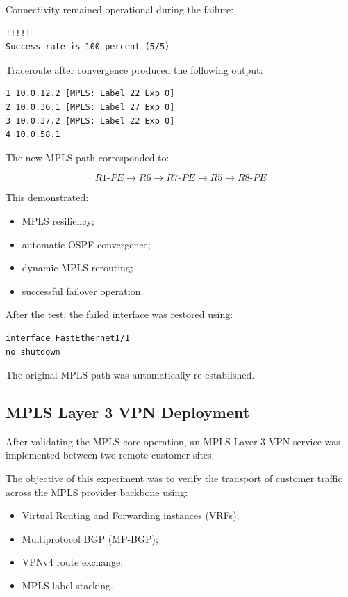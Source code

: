 \documentclass[12pt]{article}
\begin{document}
Connectivity remained operational during the failure:

\begin{lstlisting}
!!!!!
Success rate is 100 percent (5/5)
\end{lstlisting}

Traceroute after convergence produced the following output:

\begin{lstlisting}
1 10.0.12.2 [MPLS: Label 22 Exp 0]
2 10.0.36.1 [MPLS: Label 27 Exp 0]
3 10.0.37.2 [MPLS: Label 22 Exp 0]
4 10.0.58.1
\end{lstlisting}

The new MPLS path corresponded to:

\[
R1\text{-}PE \rightarrow R6 \rightarrow R7\text{-}PE \rightarrow R5 \rightarrow R8\text{-}PE
\]

This demonstrated:
\begin{itemize}
    \item MPLS resiliency;
    \item automatic OSPF convergence;
    \item dynamic MPLS rerouting;
    \item successful failover operation.
\end{itemize}

After the test, the failed interface was restored using:

\begin{lstlisting}
interface FastEthernet1/1
no shutdown
\end{lstlisting}

The original MPLS path was automatically re-established.

\subsection{MPLS Layer 3 VPN Deployment}

After validating the MPLS core operation, an MPLS Layer 3 VPN service was implemented between two remote customer sites.

The objective of this experiment was to verify the transport of customer traffic across the MPLS provider backbone using:
\begin{itemize}
    \item Virtual Routing and Forwarding instances (VRFs);
    \item Multiprotocol BGP (MP-BGP);
    \item VPNv4 route exchange;
    \item MPLS label stacking.
\end{itemize}
\end{document}

